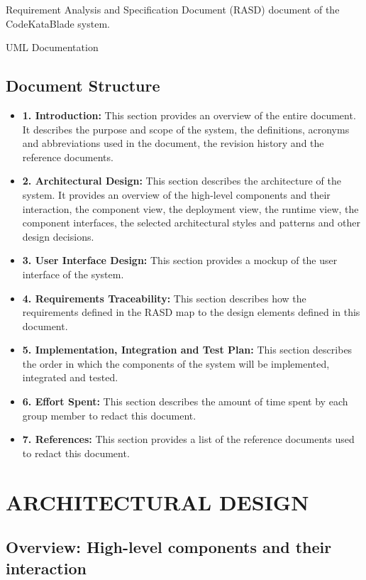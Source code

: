 \documentclass{article}
\begin{document}
Requirement Analysis and Specification Document (RASD) document of the CodeKataBlade system.

UML Documentation

\subsection{Document Structure}

\begin{itemize}
    \item \textbf{1. Introduction:} This section provides an overview of the entire document. It describes the purpose and scope of the system, the definitions, acronyms and abbreviations used in the document, the revision history and the reference documents.
    \item \textbf{2. Architectural Design:} This section describes the architecture of the system. It provides an overview of the high-level components and their interaction, the component view, the deployment view, the runtime view, the component interfaces, the selected architectural styles and patterns and other design decisions.
    \item \textbf{3. User Interface Design:} This section provides a mockup of the user interface of the system.
    \item \textbf{4. Requirements Traceability:} This section describes how the requirements defined in the RASD map to the design elements defined in this document.
    \item \textbf{5. Implementation, Integration and Test Plan:} This section describes the order in which the components of the system will be implemented, integrated and tested.
    \item \textbf{6. Effort Spent:} This section describes the amount of time spent by each group member to redact this document.
    \item \textbf{7. References:} This section provides a list of the reference documents used to redact this document. 
\end{itemize}

\section{ARCHITECTURAL DESIGN}
\subsection{Overview: High-level components and their interaction}
\end{document}
